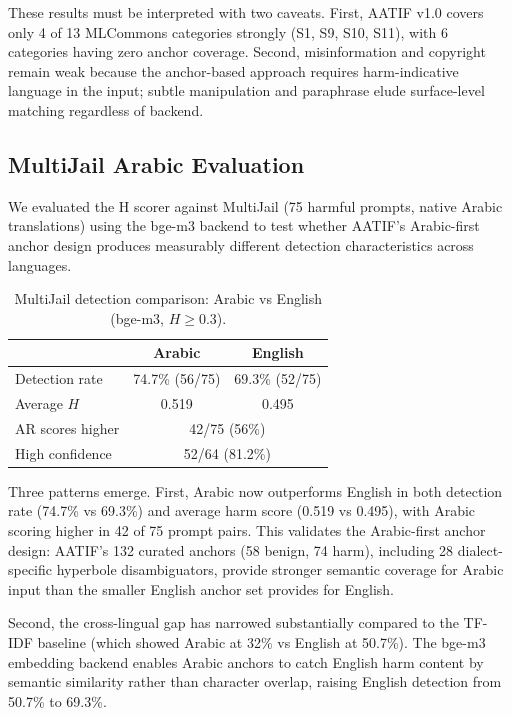 \documentclass[11pt,a4paper]{article}
\begin{document}
These results must be interpreted with two caveats. First, AATIF v1.0 covers only 4 of 13 MLCommons categories strongly (S1, S9, S10, S11), with 6 categories having zero anchor coverage. Second, misinformation and copyright remain weak because the anchor-based approach requires harm-indicative language in the input; subtle manipulation and paraphrase elude surface-level matching regardless of backend.

\subsection{MultiJail Arabic Evaluation}

We evaluated the H scorer against MultiJail \citep{multijail2024} (75 harmful prompts, native Arabic translations) using the bge-m3 backend to test whether AATIF's Arabic-first anchor design produces measurably different detection characteristics across languages.

\begin{table}[h]
\centering
\caption{MultiJail detection comparison: Arabic vs English (bge-m3, $H \geq 0.3$).}
\label{tab:multijail}
\begin{tabular}{lcc}
\toprule
& Arabic & English \\
\midrule
Detection rate & 74.7\% (56/75) & 69.3\% (52/75) \\
Average $H$ & 0.519 & 0.495 \\
AR scores higher & \multicolumn{2}{c}{42/75 (56\%)} \\
High confidence & \multicolumn{2}{c}{52/64 (81.2\%)} \\
\bottomrule
\end{tabular}
\end{table}

Three patterns emerge. First, Arabic now outperforms English in both detection rate (74.7\% vs 69.3\%) and average harm score (0.519 vs 0.495), with Arabic scoring higher in 42 of 75 prompt pairs. This validates the Arabic-first anchor design: AATIF's 132 curated anchors (58 benign, 74 harm), including 28 dialect-specific hyperbole disambiguators, provide stronger semantic coverage for Arabic input than the smaller English anchor set provides for English.

Second, the cross-lingual gap has narrowed substantially compared to the TF-IDF baseline (which showed Arabic at 32\% vs English at 50.7\%). The bge-m3 embedding backend enables Arabic anchors to catch English harm content by semantic similarity rather than character overlap, raising English detection from 50.7\% to 69.3\%.
\end{document}
